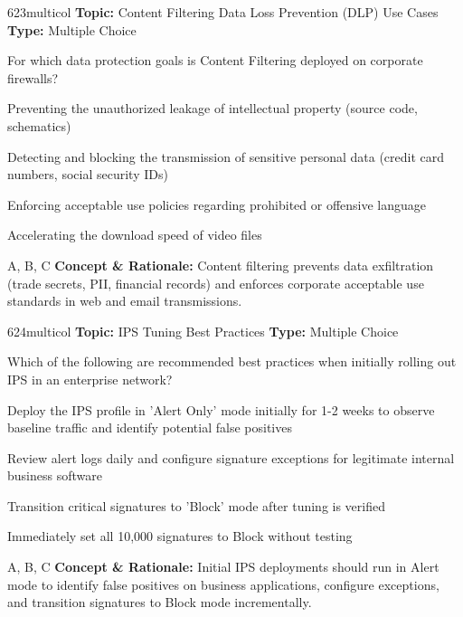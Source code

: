 \begin{qcard}{623}{multicol}
\textcolor{darkslate!75}{\small\textbf{Topic:} Content Filtering Data Loss Prevention (DLP) Use Cases \hfill \textbf{Type:} Multiple Choice}\vspace{0.4em}\par
For which data protection goals is Content Filtering deployed on corporate firewalls?
\begin{qoptions}
\item Preventing the unauthorized leakage of intellectual property (source code, schematics)
\item Detecting and blocking the transmission of sensitive personal data (credit card numbers, social security IDs)
\item Enforcing acceptable use policies regarding prohibited or offensive language
\item Accelerating the download speed of video files
\end{qoptions}
\end{qcard}
\nopagebreak
\begin{explainbox}{A, B, C}
\textbf{Concept \& Rationale:} Content filtering prevents data exfiltration (trade secrets, PII, financial records) and enforces corporate acceptable use standards in web and email transmissions.
\end{explainbox}

\begin{qcard}{624}{multicol}
\textcolor{darkslate!75}{\small\textbf{Topic:} IPS Tuning Best Practices \hfill \textbf{Type:} Multiple Choice}\vspace{0.4em}\par
Which of the following are recommended best practices when initially rolling out IPS in an enterprise network?
\begin{qoptions}
\item Deploy the IPS profile in 'Alert Only' mode initially for 1-2 weeks to observe baseline traffic and identify potential false positives
\item Review alert logs daily and configure signature exceptions for legitimate internal business software
\item Transition critical signatures to 'Block' mode after tuning is verified
\item Immediately set all 10,000 signatures to Block without testing
\end{qoptions}
\end{qcard}
\nopagebreak
\begin{explainbox}{A, B, C}
\textbf{Concept \& Rationale:} Initial IPS deployments should run in Alert mode to identify false positives on business applications, configure exceptions, and transition signatures to Block mode incrementally.
\end{explainbox}

